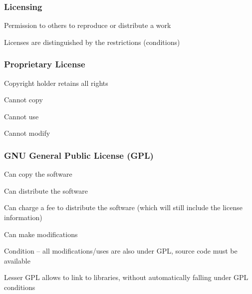 \documentclass[t,12pt,numbers,fleqn]{beamer}
\begin{document}

\begin{frame}
\frametitle{Licensing}

\bi
\item Permission to others to reproduce or distribute a work
\item Licenses are distinguished by the restrictions (conditions)
\ei

\end{frame}


\begin{frame}
\frametitle{Proprietary License}

\bi
\item Copyright holder retains all rights
\item Cannot copy
\item Cannot use
\item Cannot modify
\ei

\end{frame}


\begin{frame}
\frametitle{GNU General Public License (GPL)}

\bi
\item Can copy the software
\item Can distribute the software
\item Can charge a fee to distribute the software (which will still include the license information)
\item Can make modifications
\item Condition -- all modifications/uses are also under GPL, source
  code must be available
\item Lesser GPL allows to link to libraries, without automatically falling under
  GPL conditions
\ei

\end{frame}

\end{document}
